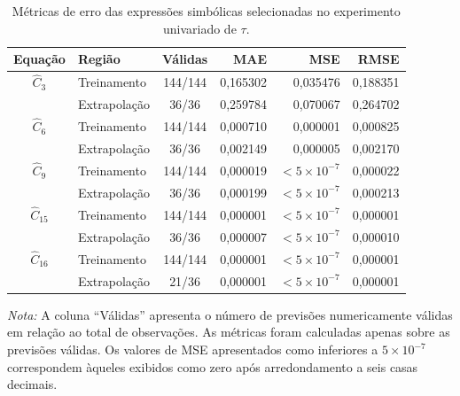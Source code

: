 \begin{table}[htbp]
\centering
\caption{Métricas de erro das expressões simbólicas
selecionadas no experimento univariado de $\tau$.}
\label{tab:tau_metricas}
\small
\setlength{\tabcolsep}{5pt}

\begin{tabular}{c l c r r r}
\hline
\textbf{Equação} &
\textbf{Região} &
\textbf{Válidas} &
\textbf{MAE} &
\textbf{MSE} &
\textbf{RMSE} \\
\hline

$\widehat{C}_3$ &
Treinamento & 144/144 &
0,165302 & 0,035476 & 0,188351 \\

&
Extrapolação & 36/36 &
0,259784 & 0,070067 & 0,264702 \\

\hline

$\widehat{C}_6$ &
Treinamento & 144/144 &
0,000710 & 0,000001 & 0,000825 \\

&
Extrapolação & 36/36 &
0,002149 & 0,000005 & 0,002170 \\

\hline

$\widehat{C}_9$ &
Treinamento & 144/144 &
0,000019 & $<5\times10^{-7}$ & 0,000022 \\

&
Extrapolação & 36/36 &
0,000199 & $<5\times10^{-7}$ & 0,000213 \\

\hline

$\widehat{C}_{15}$ &
Treinamento & 144/144 &
0,000001 & $<5\times10^{-7}$ & 0,000001 \\

&
Extrapolação & 36/36 &
0,000007 & $<5\times10^{-7}$ & 0,000010 \\

\hline

$\widehat{C}_{16}$ &
Treinamento & 144/144 &
0,000001 & $<5\times10^{-7}$ & 0,000001 \\

&
Extrapolação & 21/36 &
0,000001 & $<5\times10^{-7}$ & 0,000001 \\

\hline
\end{tabular}

\vspace{0.3cm}

\begin{minipage}{0.95\textwidth}
\footnotesize
\textit{Nota:} A coluna ``Válidas'' apresenta o número
de previsões numericamente válidas em relação ao
total de observações. As métricas foram calculadas
apenas sobre as previsões válidas. Os valores de
MSE apresentados como inferiores a $5\times10^{-7}$
correspondem àqueles exibidos como zero após
arredondamento a seis casas decimais.
\end{minipage}

\end{table}


